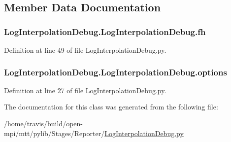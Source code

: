 \subsection{Member Data Documentation}
\hypertarget{class_log_interpolation_debug_1_1_log_interpolation_debug_a8b8ec0df24628757f23bd8208dbca19c}{
\subsubsection[{fh}]{\setlength{\rightskip}{0pt plus 5cm}Log\-Interpolation\-Debug.\-Log\-Interpolation\-Debug.\-fh}}\label{class_log_interpolation_debug_1_1_log_interpolation_debug_a8b8ec0df24628757f23bd8208dbca19c}


Definition at line 49 of file Log\-Interpolation\-Debug.\-py.

\hypertarget{class_log_interpolation_debug_1_1_log_interpolation_debug_a867dc9203570065ce846fd0d24434695}{
\subsubsection[{options}]{\setlength{\rightskip}{0pt plus 5cm}Log\-Interpolation\-Debug.\-Log\-Interpolation\-Debug.\-options}}\label{class_log_interpolation_debug_1_1_log_interpolation_debug_a867dc9203570065ce846fd0d24434695}


Definition at line 27 of file Log\-Interpolation\-Debug.\-py.



The documentation for this class was generated from the following file\-:\begin{DoxyCompactItemize}
\item 
/home/travis/build/open-\/mpi/mtt/pylib/\-Stages/\-Reporter/\hyperlink{_log_interpolation_debug_8py}{Log\-Interpolation\-Debug.\-py}\end{DoxyCompactItemize}
